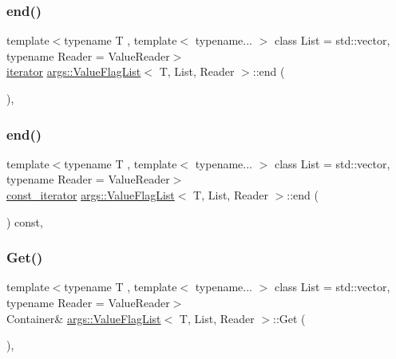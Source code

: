 \subsubsection{\texorpdfstring{end()}{end()}\hspace{0.1cm}{\footnotesize\ttfamily [1/2]}}
{\footnotesize\ttfamily template$<$typename T , template$<$ typename... $>$ class List = std\+::vector, typename Reader  = Value\+Reader$>$ \\
\hyperlink{classargs_1_1_value_flag_list_a4374b7a70c21c42d72912ec5ce323515}{iterator} \hyperlink{classargs_1_1_value_flag_list}{args\+::\+Value\+Flag\+List}$<$ T, List, Reader $>$\+::end (\begin{DoxyParamCaption}{ }\end{DoxyParamCaption})\hspace{0.3cm}{\ttfamily [inline]}, {\ttfamily [noexcept]}}

\mbox{\label{classargs_1_1_value_flag_list_a5bc842210d8e06e5150d15fcfc2cbc5a}} 
\subsubsection{\texorpdfstring{end()}{end()}\hspace{0.1cm}{\footnotesize\ttfamily [2/2]}}
{\footnotesize\ttfamily template$<$typename T , template$<$ typename... $>$ class List = std\+::vector, typename Reader  = Value\+Reader$>$ \\
\hyperlink{classargs_1_1_value_flag_list_afc267bd3d85ff266eccf4b66cea4a274}{const\+\_\+iterator} \hyperlink{classargs_1_1_value_flag_list}{args\+::\+Value\+Flag\+List}$<$ T, List, Reader $>$\+::end (\begin{DoxyParamCaption}{ }\end{DoxyParamCaption}) const\hspace{0.3cm}{\ttfamily [inline]}, {\ttfamily [noexcept]}}

\mbox{\label{classargs_1_1_value_flag_list_a5901ba26d5e4f78732e1474fe8780950}} 
\subsubsection{\texorpdfstring{Get()}{Get()}}
{\footnotesize\ttfamily template$<$typename T , template$<$ typename... $>$ class List = std\+::vector, typename Reader  = Value\+Reader$>$ \\
Container\& \hyperlink{classargs_1_1_value_flag_list}{args\+::\+Value\+Flag\+List}$<$ T, List, Reader $>$\+::Get (\begin{DoxyParamCaption}{ }\end{DoxyParamCaption})\hspace{0.3cm}{\ttfamily [inline]}, {\ttfamily [noexcept]}}

